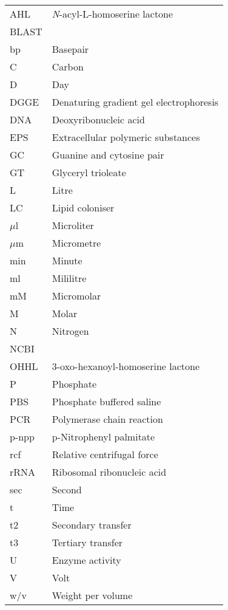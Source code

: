 \documentclass[11pt]{article}
\begin{document}
\begin{table}
\begin{tabular}{  p{6.9cm} | p{6.9cm} }
\hline
AHL & \emph{N}-acyl-L-homoserine lactone \\
BLAST &   \\
bp & Basepair \\
C & Carbon \\
D & Day \\
DGGE & Denaturing gradient gel electrophoresis \\
DNA & Deoxyribonucleic acid  \\
 EPS & Extracellular polymeric substances \\
 GC & Guanine and cytosine pair \\
GT & Glyceryl trioleate \\
L & Litre \\
LC & Lipid coloniser \\
$\mu$l & Microliter \\
$\mu$m & Micrometre \\
min & Minute \\
ml & Mililitre \\
mM & Micromolar \\
M & Molar \\
N & Nitrogen \\
NCBI &   \\
OHHL & 3-oxo-hexanoyl-homoserine lactone \\
P  &  Phosphate \\
PBS & Phosphate buffered saline \\
PCR & Polymerase chain reaction \\
 p-npp & p-Nitrophenyl palmitate \\
rcf & Relative centrifugal force \\
rRNA & Ribosomal ribonucleic acid \\
sec & Second \\
t & Time \\
 t2 & Secondary transfer \\
t3 & Tertiary transfer \\
U & Enzyme activity \\
V & Volt \\
w/v & Weight per volume \\
  \hline
\end{tabular}
\end{table}
\end{document}
